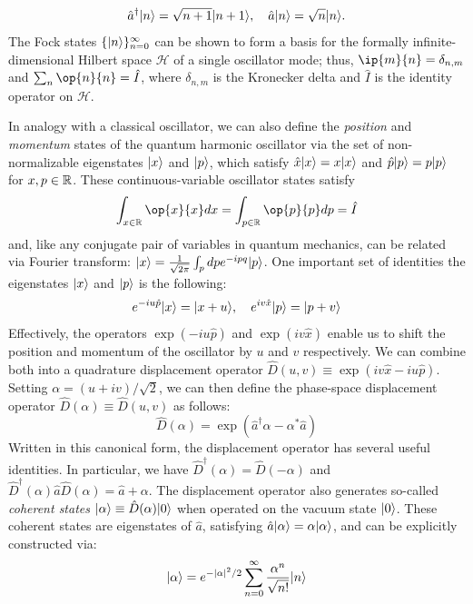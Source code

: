 \begin{equation}
    \hat{a}^\dagger\lvert n\rangle = \sqrt{n+1}\lvert n+1\rangle, \quad \hat{a}\lvert n\rangle = \sqrt{n}\lvert n\rangle.
\end{equation}
The Fock states $\{\lvert n\rangle\}_{n=0}^\infty$ can be shown to form a basis for the formally infinite-dimensional Hilbert space $\mathcal{H}$ of a single oscillator mode; thus, $\ip{m}{n} = \delta_{n, m}$ and $\sum_n \op{n}{n} = \hat{I}$, where $\delta_{n, m}$ is the Kronecker delta and $\hat{I}$ is the identity operator on $\mathcal{H}$. 

In analogy with a classical oscillator, we can also define the \textit{position} and \textit{momentum} states of the quantum harmonic oscillator via the set of non-normalizable eigenstates $\lvert x\rangle$ and $\lvert p\rangle$, which satisfy $\hat{x}\lvert x\rangle = x\lvert x\rangle$ and $\hat{p}\lvert p\rangle = p\lvert p\rangle$ for $x, p \in \mathbb{R}$. These continuous-variable oscillator states satisfy
\begin{equation}
    \int_{x \in \R} \op{x}{x}dx = \int_{p \in \R} \op{p}{p} dp = \hat{I}
\end{equation}
and, like any conjugate pair of variables in quantum mechanics, can be related via Fourier transform: $\lvert x\rangle = \frac{1}{\sqrt{2\pi}} \int_p dp e^{-ipq}\lvert p\rangle$. One important set of identities the eigenstates $\lvert x\rangle$ and $\lvert p\rangle$ is the following: 
\begin{equation}
    e^{-iu\hat{p}}\lvert x\rangle = \lvert x + u\rangle, \quad e^{iv\hat{x}}\lvert p\rangle = \lvert p+v\rangle
\end{equation}
Effectively, the operators $\exp(-iu\hat{p})$ and $\exp(iv\hat{x})$ enable us to shift the position and momentum of the oscillator by $u$ and $v$ respectively. We can combine both into a quadrature displacement operator $\hat{D}(u, v) \equiv \exp(iv\hat{x} - iu\hat{p})$. Setting $\alpha = (u+iv)/\sqrt{2}$, we can then define the phase-space displacement operator $\hat{D}(\alpha) \equiv \hat{D}(u, v)$ as follows: 
\begin{equation}
    \hat{D}(\alpha) = \exp(\hat{a}^\dagger \alpha - \alpha^\ast \hat{a})
\end{equation}
Written in this canonical form, the displacement operator has several useful identities. In particular,  we have $\hat{D}^\dagger(\alpha) = \hat{D}(-\alpha)$ and $\hat{D}^\dagger(\alpha) \hat{a} \hat{D}(\alpha) = \hat{a} + \alpha$. The displacement operator also generates so-called \textit{coherent states} $\lvert\alpha\rangle \equiv \hat{D}(\alpha)\lvert0\rangle$ when operated on the vacuum state $\lvert0\rangle$. These coherent states are eigenstates of $\hat{a}$, satisfying $\hat{a}\lvert\alpha\rangle = \alpha\lvert\alpha\rangle$, and can be explicitly constructed via:
\begin{equation}
    \lvert\alpha\rangle = e^{-|\alpha|^2/2}\sum_{n=0}^\infty \frac{\alpha^n}{\sqrt{n!}} \lvert n\rangle
\end{equation}

